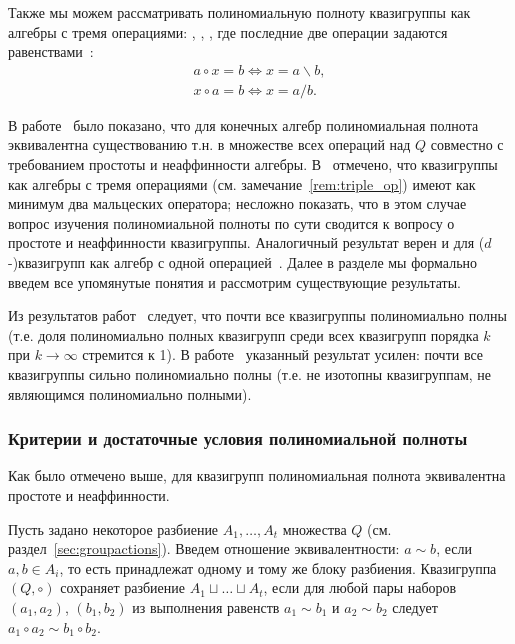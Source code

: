     \begin{remark}
    \label{rem:triple_op}
        Также мы можем рассматривать полиномиальную полноту квазигруппы как алгебры с тремя операциями: \textquote{$\circ$}, \textquote{$\backslash$}, \textquote{$/$}, где последние две операции задаются равенствами~\cite{belousov}:
        \begin{gather*}
            a \circ x = b \Leftrightarrow x = a \backslash b, \\
            x \circ a = b \Leftrightarrow x = a / b.
        \end{gather*}
    \end{remark}

    В работе~\cite{hagemann} было показано, что для конечных алгебр полиномиальная полнота эквивалентна существованию т.н.  в множестве всех операций над $Q$ совместно с требованием простоты и неаффинности алгебры.
    В~\cite{artamonov2013latin} отмечено, что квазигруппы как алгебры с тремя операциями (см. замечание~\ref{rem:triple_op}) имеют как минимум два мальцеских оператора; несложно показать, что в этом случае вопрос изучения полиномиальной полноты по сути сводится к вопросу о простоте и неаффинности квазигруппы.
    Аналогичный результат верен и для ($d$-)квазигрупп как алгебр с одной операцией~\cite{chap24}.
    Далее в разделе мы формально введем все упомянутые понятия и рассмотрим существующие результаты.

    Из результатов работ~\cite{salomaa63, cameron92} следует, что почти все квазигруппы полиномиально полны (т.е. доля полиномиально полных квазигрупп среди всех квазигрупп порядка $k$ при $k \to \infty$ стремится к 1).
    В работе~\cite{galatenko22} указанный результат усилен: почти все квазигруппы сильно полиномиально полны (т.е. не изотопны квазигруппам, не являющимся полиномиально полными).


\subsubsection{Критерии и достаточные условия полиномиальной полноты}

    Как было отмечено выше, для квазигрупп полиномиальная полнота эквивалентна простоте и неаффинности.

    \begin{definition}
        Пусть задано некоторое разбиение $A_1, \ldots, A_t$ множества $Q$ (см. раздел~\ref{sec:groupactions}).
        Введем отношение эквивалентности: $a \sim b$, если $a, b \in A_i$, то есть принадлежат одному и тому же блоку разбиения.
        Квазигруппа $(Q, \circ)$ сохраняет разбиение $A_1 \sqcup \ldots \sqcup A_t$, если для любой пары наборов $(a_1, a_2)$, $(b_1, b_2)$ из выполнения равенств $a_1 \sim b_1$ и $a_2 \sim b_2$ следует $a_1 \circ a_2 \sim b_1 \circ b_2$. 
    \end{definition}

